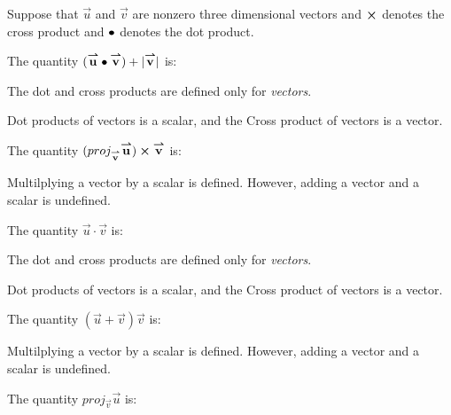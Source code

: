 \documentclass{ximera}
\author{Jim Talamo}
\begin{document}
\begin{exercise}
Suppose that $\vec u $ and $\vec v $ are nonzero three dimensional vectors and $\boldsymbol\times$ denotes the cross product and $\bullet$ denotes the dot product.

The quantity $({\overset{\boldsymbol{\rightharpoonup}}{\mathbf{u}}} \bullet {\overset{\boldsymbol{\rightharpoonup}}{\mathbf{v}}})+ |{\overset{\boldsymbol{\rightharpoonup}}{\mathbf{v}}}|$ is:

\begin{multipleChoice}
\end{multipleChoice}


\begin{hint}
The dot and cross products are defined only for \emph{vectors}.
\end{hint}

\begin{hint}
Dot products of vectors is a scalar, and the Cross product of vectors is a vector.
\end{hint}



The quantity $(proj_{{\overset{\boldsymbol{\rightharpoonup}}{\mathbf{v}}}} {\overset{\boldsymbol{\rightharpoonup}}{\mathbf{u}}})\boldsymbol\times {\overset{\boldsymbol{\rightharpoonup}}{\mathbf{v}}}$ is:

\begin{multipleChoice}
\end{multipleChoice}


\begin{hint}
Multilplying a vector by a scalar is defined. However, adding a vector and a scalar is undefined.
\end{hint}


The quantity $\vec u \cdot \vec v$ is:

\begin{multipleChoice}
\end{multipleChoice}

\begin{hint}
The dot and cross products are defined only for \emph{vectors}.
\end{hint}
\begin{hint}
Dot products of vectors is a scalar, and the Cross product of vectors is a vector.
\end{hint}


The quantity $(\vec u + \vec v) \vec v$ is:
\begin{multipleChoice}
\end{multipleChoice}

\begin{hint}
Multilplying a vector by a scalar is defined. However, adding a vector and a scalar is undefined.
\end{hint}


The quantity $proj_{\vec v} \vec u$ is:

\begin{multipleChoice}
\end{multipleChoice}





\end{exercise}
\end{document}
